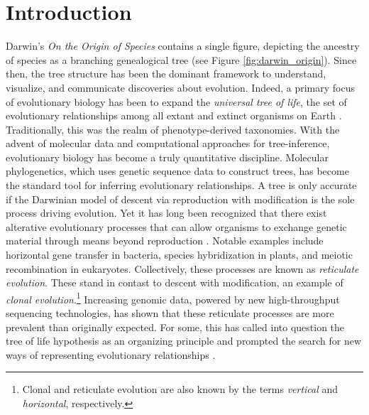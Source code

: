 \chapter{Introduction}
\label{ch:introduction}


Darwin's \emph{On the Origin of Species} contains a single figure, depicting the ancestry of species as a branching genealogical tree \cite{Darwin:1859uh} (see Figure \ref{fig:darwin_origin}).
Since then, the tree structure has been the dominant framework to understand, visualize, and communicate discoveries about evolution.
Indeed, a primary focus of evolutionary biology has been to expand the \emph{universal tree of life}, the set of evolutionary relationships among all extant and extinct organisms on Earth \cite{Bowler:2003uz}.
Traditionally, this was the realm of phenotype-derived taxonomies.
With the advent of molecular data and computational approaches for tree-inference, evolutionary biology has become a truly quantitative discipline.
Molecular phylogenetics, which uses genetic sequence data to construct trees, has become the standard tool for inferring evolutionary relationships.
A tree is only accurate if the Darwinian model of descent via reproduction with modification is the sole process driving evolution.
Yet it has long been recognized that there exist alterative evolutionary processes that can allow organisms to exchange genetic material through means beyond reproduction \cite{Arnold:2007vq}.
Notable examples include horizontal gene transfer in bacteria, species hybridization in plants, and meiotic recombination in eukaryotes.
Collectively, these processes are known as \emph{reticulate evolution}.
These stand in contast to descent with modification, an example of \emph{clonal evolution}.\footnote{Clonal and reticulate evolution are also known by the terms \emph{vertical} and \emph{horizontal}, respectively.}
Increasing genomic data, powered by new high-throughput sequencing technologies, has shown that these reticulate processes are more prevalent than originally expected.
For some, this has called into question the tree of life hypothesis as an organizing principle and prompted the search for new ways of representing evolutionary relationships \cite{Doolittle:1999,OMalley:2011tu}.

